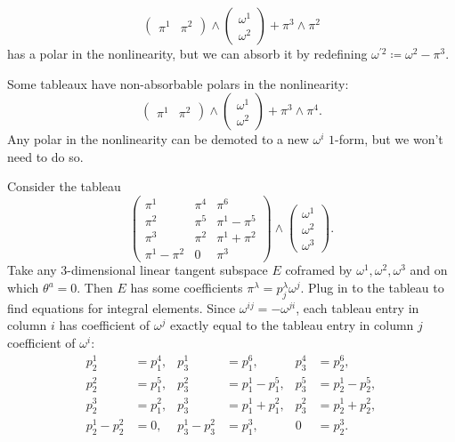 \begin{example}
    \[\left(\begin{array}{cc}
        \boxed{\pi^1} & \boxed{\pi^2}     
    \end{array}\right)\wedge 
    \left(\begin{array}{c}
        \omega^1\\
        \omega^2
    \end{array}\right)+\boxed{\pi^3}\wedge\pi^2
    \]
    has a polar in the nonlinearity, but we can absorb it by redefining $\omega^{\prime 2}\coloneqq \omega^2-\pi^3$.

    Some tableaux have non-absorbable polars in the nonlinearity:
    \[\left(\begin{array}{cc}
        \boxed{\pi^1} & \boxed{\pi^2}     
    \end{array}\right)\wedge 
    \left(\begin{array}{c}
        \omega^1\\
        \omega^2
    \end{array}\right)+\boxed{\pi^3}\wedge\boxed{\pi^4}.
    \]
    Any polar in the nonlinearity can be demoted to a new $\omega^i$ $1$-form, but we won't need to do so.
\end{example}


\begin{example}
    Consider the tableau 
    \[\left(\begin{array}{ccc}
        \boxed{\pi^1} & \boxed{\pi^4} & \boxed{\pi^6} \\
        \boxed{\pi^2} & \boxed{\pi^5} & \pi^1-\pi^5\\
        \boxed{\pi^3} & \pi^2 & \pi^1+\pi^2\\
        \pi^1-\pi^2 & 0 & \pi^3
    \end{array}\right)\wedge 
    \left(\begin{array}{c}
        \omega^1\\
        \omega^2\\
        \omega^3
    \end{array}\right).
    \]
    Take any $3$-dimensional linear tangent subspace $E$ coframed by $\omega^1,\omega^2,\omega^3$ and on which $\theta^a=0$. Then $E$ has some coefficients $\pi^\lambda=p^\lambda_j\omega^j$. Plug in to the tableau to find equations for integral elements. Since $\omega^{ij}=-\omega^{ji}$, each tableau entry in column $i$ has coefficient of $\omega^j$ exactly equal to the tableau entry in column $j$ coefficient of $\omega^i$:
    \begin{align}
        p^1_2 &= p^4_1, & p^1_3&=p^6_1, & p^4_3&=p^6_2,\\
        p^2_2 &= p^5_1, & p^2_3&=p^1_1-p^5_1, & p^5_3&=p^1_2-p^5_2,\\
        p^3_2&=p^2_1, & p^3_3&=p^1_1+p^2_1, & p^2_3&=p^1_2+p^2_2,\\
        p^1_2-p^2_2&=0, & p^1_3-p^2_3&=p^3_1, & 0&=p^3_2.
    \end{align}
\end{example}








